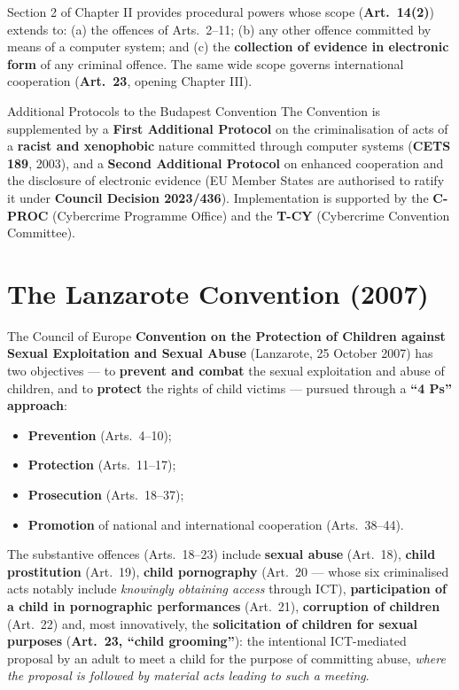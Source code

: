 \documentclass[11pt,a4paper,openany]{report}
\theoremstyle{definition}
\theoremstyle{plain}
\theoremstyle{remark}
\begin{document}
Section 2 of Chapter II provides procedural powers whose scope (\textbf{Art.\ 14(2)}) extends to: (a) the offences of Arts.\ 2--11; (b) any other offence committed by means of a computer system; and (c) the \textbf{collection of evidence in electronic form} of any criminal offence. The same wide scope governs international cooperation (\textbf{Art.\ 23}, opening Chapter III).

\begin{sidebox}{Additional Protocols to the Budapest Convention}
The Convention is supplemented by a \textbf{First Additional Protocol} on the criminalisation of acts of a \textbf{racist and xenophobic} nature committed through computer systems (\textbf{CETS 189}, 2003), and a \textbf{Second Additional Protocol} on enhanced cooperation and the disclosure of electronic evidence (EU Member States are authorised to ratify it under \textbf{Council Decision 2023/436}). Implementation is supported by the \textbf{C-PROC} (Cybercrime Programme Office) and the \textbf{T-CY} (Cybercrime Convention Committee).
\end{sidebox}

\section{The Lanzarote Convention (2007)}

The Council of Europe \textbf{Convention on the Protection of Children against Sexual Exploitation and Sexual Abuse} (Lanzarote, 25 October 2007) has two objectives --- to \textbf{prevent and combat} the sexual exploitation and abuse of children, and to \textbf{protect} the rights of child victims --- pursued through a \textbf{``4 Ps'' approach}:
\begin{itemize}
    \item \textbf{Prevention} (Arts.\ 4--10);
    \item \textbf{Protection} (Arts.\ 11--17);
    \item \textbf{Prosecution} (Arts.\ 18--37);
    \item \textbf{Promotion} of national and international cooperation (Arts.\ 38--44).
\end{itemize}

The substantive offences (Arts.\ 18--23) include \textbf{sexual abuse} (Art.\ 18), \textbf{child prostitution} (Art.\ 19), \textbf{child pornography} (Art.\ 20 --- whose six criminalised acts notably include \emph{knowingly obtaining access} through ICT), \textbf{participation of a child in pornographic performances} (Art.\ 21), \textbf{corruption of children} (Art.\ 22) and, most innovatively, the \textbf{solicitation of children for sexual purposes} (\textbf{Art.\ 23, ``child grooming''}): the intentional ICT-mediated proposal by an adult to meet a child for the purpose of committing abuse, \emph{where the proposal is followed by material acts leading to such a meeting}.
\end{document}
